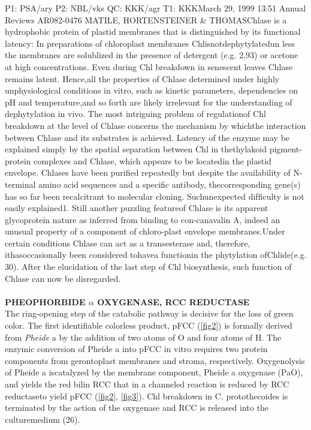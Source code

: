 \documentclass[a4paper, twocolumn, 11pt]{article}
\begin{document}
	P1: PSA/ary P2: NBL/vks QC: KKK/agr T1: KKKMarch 29, 1999 13:51 Annual Reviews AR082-0476 MATILE, HORTENSTEINER \& THOMASChlase is a hydrophobic protein of plastid membranes that is distinguished by its functional latency: In preparations of chloroplast membranes Chlisnotdephytylatedun less the membranes are solublized in the presence of detergent (e.g. 2,93) or acetone at high concentrations. Even during Chl breakdown in senescent leaves Chlase remains latent. Hence,all the properties of Chlase determined under highly unphysiological conditions in vitro, such as kinetic parameters, dependencies on pH and temperature,and so forth are likely irrelevant for the understanding of dephytylation in vivo. The most intriguing problem of regulationof Chl breakdown at the level of Chlase concerns the mechanism by whichthe interaction between Chlase and its substrates is achieved. Latency of the enzyme may be explained simply by the spatial separation between Chl in thethylakoid pigment-protein complexes and Chlase, which appears to be locatedin the plastid envelope. Chlases have been puriﬁed repeatedly but despite the availability of N-terminal amino acid sequences and a speciﬁc antibody, thecorresponding gene(s) has so far been recalcitrant to molecular cloning. Suchunexpected difﬁculty is not easily explained1. Still another puzzling featureof Chlase is its apparent glycoprotein nature as inferred from binding to con-canavalin A, indeed an unusual property of a component of chloro-plast envelope membranes.Under certain conditions Chlase can act as a transesterase and, therefore, ithasoccasionally been considered tohavea functionin the phytylation ofChlide(e.g. 30). After the elucidation of the last step of Chl biosynthesis, such function of Chlase can now be disregarded.\\	 \\
	
	\textbf{PHEOPHORBIDE $\alpha$ OXYGENASE, RCC REDUCTASE}\\ 
	
	The ring-opening step of the catabolic pathway is decisive for the loss of green color.	The ﬁrst identiﬁable colorless product,	pFCC (\ref{fig2}) is formally derived from \textit{Pheide} a by the addition of two atoms of O and four atoms of H. The enzymic conversion of Pheide a into pFCC in vitro requires two protein components from gerontoplast membranes and stroma, respectively. Oxygenolysis of Pheide a iscatalyzed by the membrane component, Pheide a oxygenase (PaO), and yields the red bilin RCC that in a channeled reaction is reduced by RCC reductaseto yield pFCC (\ref{fig2}, \ref{fig3}). Chl breakdown in C. protothecoides is terminated by the action of the oxygenase and RCC is released into the culturemedium (26).\\
	
\end{document}
